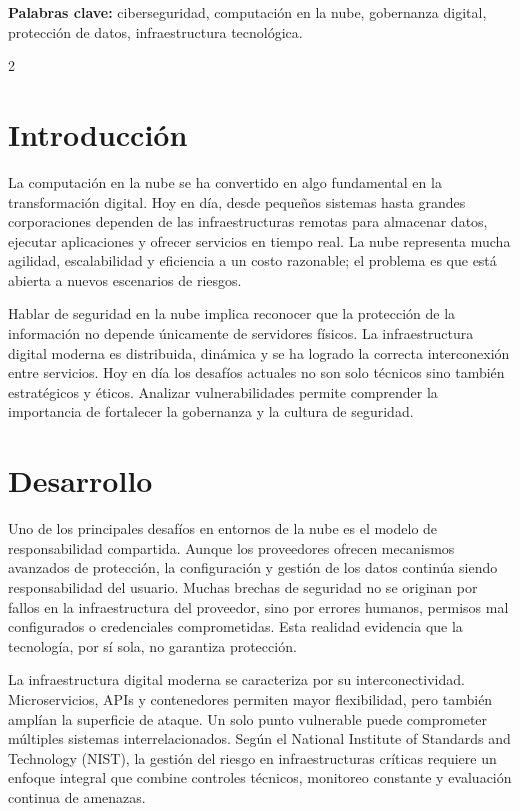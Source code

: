 \documentclass[10pt,spanish,Letterpaper,openany]{book}
\let\origtextbf\textbf
\renewcommand{\textbf}[1]{{\color{textlinetitle}\origtextbf{#1}}}
\begin{document}
\textbf{Palabras clave:} ciberseguridad, computación en la nube, gobernanza digital, protección de datos, infraestructura tecnológica.

\begin {multicols}{2}

\section{Introducción}\label{introducciuxf3n-14}

La computación en la nube se ha convertido en algo fundamental en la transformación digital. Hoy en día, desde pequeños sistemas hasta grandes corporaciones dependen de las infraestructuras remotas para almacenar datos, ejecutar aplicaciones y ofrecer servicios en tiempo real. La nube representa mucha agilidad, escalabilidad y eficiencia a un costo razonable; el problema es que está abierta a nuevos escenarios de riesgos.

Hablar de seguridad en la nube implica reconocer que la protección de la información no depende únicamente de servidores físicos. La infraestructura digital moderna es distribuida, dinámica y se ha logrado la correcta interconexión entre servicios. Hoy en día los desafíos actuales no son solo técnicos sino también estratégicos y éticos. Analizar vulnerabilidades permite comprender la importancia de fortalecer la gobernanza y la cultura de seguridad.

\section{Desarrollo}\label{desarrollo-5}

Uno de los principales desafíos en entornos de la nube es el modelo de responsabilidad compartida. Aunque los proveedores ofrecen mecanismos avanzados de protección, la configuración y gestión de los datos continúa siendo responsabilidad del usuario. Muchas brechas de seguridad no se originan por fallos en la infraestructura del proveedor, sino por errores humanos, permisos mal configurados o credenciales comprometidas. Esta realidad evidencia que la tecnología, por sí sola, no garantiza protección.

La infraestructura digital moderna se caracteriza por su interconectividad. Microservicios, APIs y contenedores permiten mayor flexibilidad, pero también amplían la superficie de ataque. Un solo punto vulnerable puede comprometer múltiples sistemas interrelacionados. Según el National Institute of Standards and Technology (NIST), la gestión del riesgo en infraestructuras críticas requiere un enfoque integral que combine controles técnicos, monitoreo constante y evaluación continua de amenazas.


\end{multicols}
\end{document}
